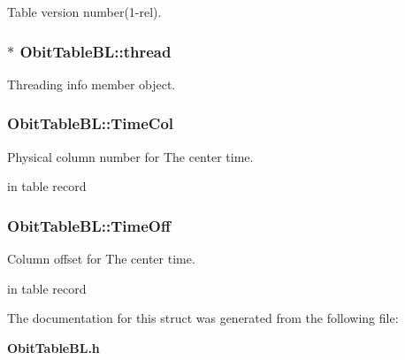 Table version number(1-rel). 

\subsubsection{$\ast$ {\bf Obit\-Table\-BL::thread}}\label{structObitTableBL_o4}


Threading info member object. 

\subsubsection{ {\bf Obit\-Table\-BL::Time\-Col}}\label{structObitTableBL_o19}


Physical column number for The center time. 

in table record 
\subsubsection{ {\bf Obit\-Table\-BL::Time\-Off}}\label{structObitTableBL_o18}


Column offset for The center time. 

in table record 

The documentation for this struct was generated from the following file:\begin{CompactItemize}
\item 
{\bf Obit\-Table\-BL.h}\end{CompactItemize}
